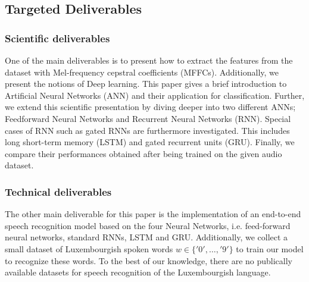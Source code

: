 
\subsection{Targeted Deliverables}

\subsubsection{Scientific deliverables}

One of the main deliverables is to present how to extract the features from the
dataset with Mel-frequency cepstral coefficients (MFFCs). Additionally, we
present the notions of Deep learning. This paper gives a brief introduction to
Artificial Neural Networks (ANN) and their application for classification.
Further, we extend this scientific presentation by diving deeper into two
different ANNs; Feedforward Neural Networks and Recurrent Neural Networks (RNN).
Special cases of RNN such as gated RNNs are furthermore investigated. This
includes long short-term memory (LSTM) and gated recurrent units (GRU). Finally,
we compare their performances obtained after being trained on the given audio
dataset.

\subsubsection{Technical deliverables} 

The other main deliverable for this paper is the implementation of an end-to-end
speech recognition model based on the four Neural Networks, i.e. feed-forward
neural networks, standard RNNs, LSTM and GRU. Additionally, we collect a small
dataset of Luxembourgish spoken words $w \in \{'0',\dots,'9'\}$ to train our
model to recognize these words. To the best of our knowledge, there are no
publically available datasets for speech recognition of the Luxembourgish
language.
